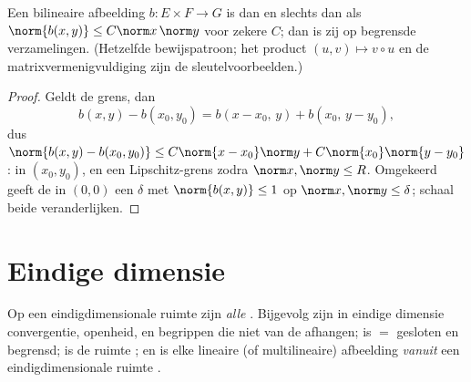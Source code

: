 \begin{proposition}\label{prop:b2:nvs:bilinear}
Een bilineaire afbeelding $b \colon E \times F \to G$ is 
dan en slechts dan als $\norm{b(x,y)} \leq C\norm x\,\norm y$ voor
zekere $C$; dan is zij  op begrensde verzamelingen.
(Hetzelfde bewijspatroon; het product $(u, v) \mapsto v \circ u$ en
de matrixvermenigvuldiging zijn de sleutelvoorbeelden.)
\end{proposition}

\begin{proof}
Geldt de grens, dan
\[
b(x,y) - b(x_0,y_0) = b(x - x_0,\, y) + b(x_0,\, y - y_0),
\]
dus $\norm{b(x,y) - b(x_0,y_0)} \leq C\norm{x - x_0}\norm y +
C\norm{x_0}\norm{y - y_0}$:  in $(x_0, y_0)$, en een
Lipschitz-grens zodra $\norm x, \norm y \leq R$. Omgekeerd geeft de
 in $(0,0)$ een $\delta$ met $\norm{b(x,y)} \leq 1$ op
$\norm x, \norm y \leq \delta$; schaal beide veranderlijken.
\end{proof}

\section{Eindige dimensie}

\begin{theorem}\label{thm:b2:nvs:finitedim}
Op een eindigdimensionale ruimte zijn \emph{alle 
}. Bijgevolg zijn in eindige dimensie convergentie,
openheid,  en  begrippen die niet van de
 afhangen; is  $=$ gesloten en begrensd; is de ruimte
; en is elke lineaire (of multilineaire) afbeelding
\emph{vanuit} een eindigdimensionale ruimte .
\end{theorem}


